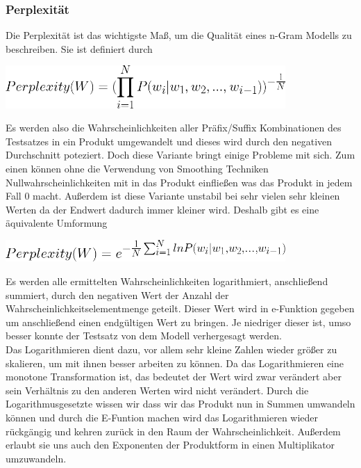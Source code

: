\documentclass[12pt]{article}
\begin{document}
\subsubsection{Perplexität}
Die Perplexität ist das wichtigste Maß, um die Qualität eines n-Gram Modells zu beschreiben. Sie ist definiert durch
\begin{center}
	\includegraphics[width=0.8\textwidth]{statics/Furitsch/prod_var.png}
\end{center}
Es werden also die Wahrscheinlichkeiten aller Präfix/Suffix Kombinationen des Testsatzes in ein Produkt umgewandelt und dieses wird durch den negativen Durchschnitt poteziert.
Doch diese Variante bringt einige Probleme mit sich. Zum einen können ohne die Verwendung von Smoothing Techniken Nullwahrscheinlichkeiten mit in das Produkt einfließen was das Produkt in jedem Fall 0 macht. Außerdem ist diese Variante unstabil bei sehr vielen sehr kleinen Werten da der Endwert dadurch immer kleiner wird.
Deshalb gibt es eine äquivalente Umformung
\cite{jurafsk}
\begin{center}
	\includegraphics[width=0.8\textwidth]{statics/Furitsch/log_var.png}
\end{center}
Es werden alle ermittelten Wahrscheinlichkeiten logarithmiert, anschließend summiert, durch den negativen Wert der Anzahl der Wahrscheinlichkeitselementmenge geteilt. Dieser Wert wird in e-Funktion gegeben um anschließend einen endgültigen Wert zu bringen. Je niedriger dieser ist, umso besser konnte der Testsatz von dem Modell verhergesagt werden.\\ Das Logarithmieren dient dazu, vor allem sehr kleine Zahlen wieder größer zu skalieren, um mit ihnen besser arbeiten zu können. Da das Logarithmieren eine monotone Transformation ist, das bedeutet der Wert wird zwar verändert aber sein Verhältnis zu den anderen Werten wird nicht verändert. Durch die Logarithmusgesetzte wissen wir dass wir das Produkt nun in Summen umwandeln können und durch die E-Funtion machen wird das Logarithmieren wieder rückgängig und kehren zurück in den Raum der Wahrscheinlichkeit. Außerdem erlaubt sie uns auch den Exponenten der Produktform in einen Multiplikator umzuwandeln.
\cite{jurafsk}
\end{document}
